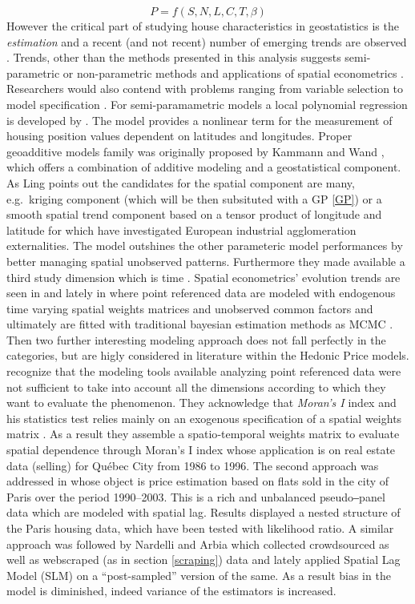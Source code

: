 \documentclass[
  12pt,
  a4paper,
  oneside]{book}
\theoremstyle{definition}
\theoremstyle{definition}
\theoremstyle{definition}
\theoremstyle{remark}
\begin{document}
\[P=f\left(S, N, L, C, T, \beta\right)\]
However the critical part of studying house characteristics in geostatistics is the \emph{estimation} and a recent (and not recent) number of emerging trends are observed \citep{SHEPPARD19991595}. Trends, other than the methods presented in this analysis suggests semi-parametric or non-parametric methods and applications of spatial econometrics \citet{Ling}. Researchers would also contend with problems ranging from variable selection to model specification \citeyearpar{Ling}.
For semi-paramametric models a local polynomial regression is developed by \citet{clapp}. The model provides a nonlinear term for the measurement of housing position values dependent on latitudes and longitudes.
Proper geoadditive models family was originally proposed by Kammann and Wand \citeyearpar{kammanwand}, which offers a combination of additive modeling \citep{buja1989} and a geostatistical component. As Ling \citeyearpar{Ling} points out the candidates for the spatial component are many, e.g.~kriging component \citep{dey2017metamodel} (which will be then subsituted with a GP \ref{GP}) or a smooth spatial trend component based on a tensor product of longitude and latitude for which \citet{basilebenfratmcast} have investigated European industrial agglomeration externalities. The model outshines the other parameteric model performances by better managing spatial unobserved patterns. Furthermore they made available a third study dimension which is time \citeyearpar{Ling}.
Spatial econometrics' evolution trends are seen in \citet{spateconomshifei} and lately in \citet{spateconanslein} where point referenced data are modeled with endogenous time varying spatial weights matrices and unobserved common factors and ultimately are fitted with traditional bayesian estimation methods as MCMC \citeyearpar{spateconanslein}.
Then two further interesting modeling approach does not fall perfectly in the categories, but are higly considered in literature within the Hedonic Price models. \citet{dubelegros} recognize that the modeling tools available analyzing point referenced data were not sufficient to take into account all the dimensions according to which they want to evaluate the phenomenon. They acknowledge that \emph{Moran's I} index and his statistics test relies mainly on an exogenous specification of a spatial weights matrix \citeyearpar{dubelegros}. As a result they assemble a spatio‐temporal weights matrix to evaluate spatial dependence through Moran's I index whose application is on real estate data (selling) for Québec City from 1986 to 1996. The second approach was addressed in \citet{baltagiparis} whose object is price estimation based on flats sold in the city of Paris over the period 1990--2003. This is a rich and unbalanced pseudo‒panel data which are modeled with spatial lag. Results displayed a nested structure of the Paris housing data, which have been tested with likelihood ratio. A similar approach was followed by Nardelli and Arbia \citep{arbia2020spatial} which collected crowdsourced as well as webscraped (as in section \ref{scraping}) data and lately applied Spatial Lag Model (SLM) on a ``post-sampled'' \citep{arbia2020postsampling} version of the same. As a result bias in the model is diminished, indeed variance of the estimators is increased.
\end{document}
